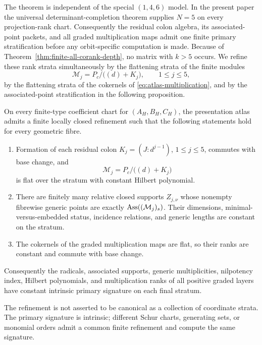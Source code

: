 

The theorem is independent of the special \((1,4,6)\) model.  In the
present paper the universal determinant-completion theorem supplies
\(N=5\) on every projection-rank chart.  Consequently the residual
colon algebra, its associated-point packets, and all graded
multiplication maps admit one finite primary stratification before
any orbit-specific computation is made.
Because of Theorem~\ref{thm:finite-all-corank-depth}, no matrix with
\(k>5\) occurs.  We refine these rank strata simultaneously by the
flattening strata of the finite modules
\[
 \mathcal M_j=P_c/\bigl((d)+K_j\bigr),\qquad 1\le j\le5,
\]
by the flattening strata of the cokernels of
\eqref{eq:atlas-multiplication}, and by the associated-point
stratification in the following proposition.

\begin{proposition}
\label{prop:associated-prime-refinement}
On every finite-type coefficient chart for
\((A_H,B_H,C_H)\), the presentation atlas admits a finite locally
closed refinement such that the following statements hold for every
geometric fibre.
\begin{enumerate}
\item Formation of each residual colon
\(K_j=(J:d^{j-1})\), \(1\le j\le5\), commutes with base change,
and
\[
 \mathcal M_j=P_c/\bigl((d)+K_j\bigr)
\]
is flat over the stratum with constant Hilbert polynomial.
\item There are finitely many relative closed supports
\(Z_{j,\nu}\) whose nonempty fibrewise generic points are exactly
\(\operatorname{Ass}((\mathcal M_j)_s)\).  Their dimensions,
minimal-versus-embedded status, incidence relations, and generic
lengths are constant on the stratum.
\item The cokernels of the graded multiplication maps are flat, so
their ranks are constant and commute with base change.
\end{enumerate}
Consequently the radicals, associated supports, generic
multiplicities, nilpotency index, Hilbert polynomials, and
multiplication ranks of all positive graded layers have constant
intrinsic primary signature on each final stratum.

The refinement is not asserted to be canonical as a collection of
coordinate strata.  The primary signature is intrinsic; different
Schur charts, generating sets, or monomial orders admit a common
finite refinement and compute the same signature.
\end{proposition}

